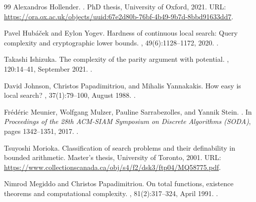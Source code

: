 \documentclass[10pt,a4paper]{article}
\theoremstyle{definition}
\theoremstyle{plain}
\theoremstyle{remark}
\begin{document}
\begin{thebibliography}{99}
Alexandros Hollender.
.
\newblock PhD thesis, University of Oxford, 2021.
\newblock URL:
  \url{https://ora.ox.ac.uk/objects/uuid:67e2d80b-76bf-4b49-9b7d-8bbd91633dd7}.

Pavel Hub{\'{a}}{\v{c}}ek and Eylon Yogev.
\newblock Hardness of continuous local search: Query complexity and
  cryptographic lower bounds.
, 49(6):1128--1172, 2020.
\newblock \href {https://doi.org/10.1137/17m1118014}
  {}.

Takashi Ishizuka.
\newblock The complexity of the parity argument with potential.
, 120:14--41, September
  2021.
\newblock \href {https://doi.org/10.1016/j.jcss.2021.03.004}
  {}.

David Johnson, Christos Papadimitriou, and Mihalis Yannakakis.
\newblock How easy is local search?
, 37(1):79--100, August
  1988.
\newblock \href {https://doi.org/10.1016/0022-0000(88)90046-3}
  {}.

Fr{\'e}d{\'e}ric Meunier, Wolfgang Mulzer, Pauline Sarrabezolles, and Yannik
  Stein.
.
\newblock In {\em Proceedings of the 28th ACM-SIAM Symposium on Discrete
  Algorithms (SODA)}, pages 1342--1351, 2017.
\newblock \href {https://doi.org/10.1137/1.9781611974782.87}
  {}.

Tsuyoshi Morioka.
\newblock Classification of search problems and their definability in bounded
  arithmetic.
\newblock Master's thesis, University of Toronto, 2001.
\newblock URL:
  \url{https://www.collectionscanada.ca/obj/s4/f2/dsk3/ftp04/MQ58775.pdf}.

Nimrod Megiddo and Christos Papadimitriou.
\newblock On total functions, existence theorems and computational complexity.
, 81(2):317--324, April 1991.
\newblock \href {https://doi.org/10.1016/0304-3975(91)90200-L}
  {}.


\end{thebibliography}
\end{document}
